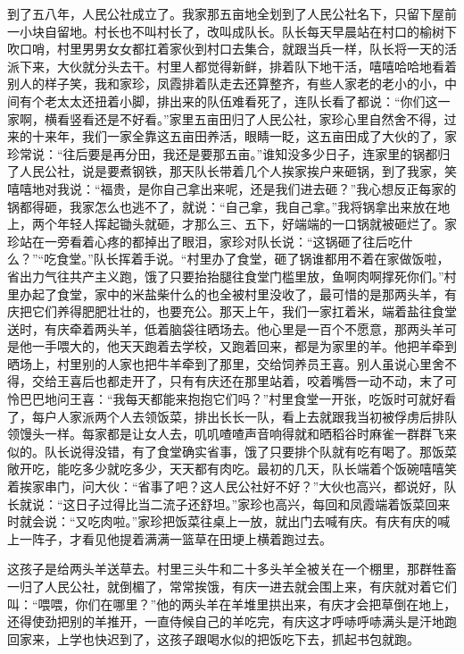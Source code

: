 \documentclass[12pt,UTF8]{ctexbook}
\begin{document}
到了五八年，人民公社成立了。我家那五亩地全划到了人民公社名下，只留下屋前一小块自留地。村长也不叫村长了，改叫成队长。队长每天早晨站在村口的榆树下吹口哨，村里男男女女都扛着家伙到村口去集合，就跟当兵一样，队长将一天的活派下来，大伙就分头去干。村里人都觉得新鲜，排着队下地干活，嘻嘻哈哈地看着别人的样子笑，我和家珍，凤霞排着队走去还算整齐，有些人家老的老小的小，中间有个老太太还扭着小脚，排出来的队伍难看死了，连队长看了都说：“你们这一家啊，横看竖看还是不好看。”家里五亩田归了人民公社，家珍心里自然舍不得，过来的十来年，我们一家全靠这五亩田养活，眼睛一眨，这五亩田成了大伙的了，家珍常说：“往后要是再分田，我还是要那五亩。”谁知没多少日子，连家里的锅都归了人民公社，说是要煮钢铁，那天队长带着几个人挨家挨户来砸锅，到了我家，笑嘻嘻地对我说：“福贵，是你自己拿出来呢，还是我们进去砸？”我心想反正每家的锅都得砸，我家怎么也逃不了，就说：“自己拿，我自己拿。”我将锅拿出来放在地上，两个年轻人挥起锄头就砸，才那么三、五下，好端端的一口锅就被砸烂了。家珍站在一旁看着心疼的都掉出了眼泪，家珍对队长说：“这锅砸了往后吃什么？”“吃食堂。”队长挥着手说。“村里办了食堂，砸了锅谁都用不着在家做饭啦，省出力气往共产主义跑，饿了只要抬抬腿往食堂门槛里放，鱼啊肉啊撑死你们。”村里办起了食堂，家中的米盐柴什么的也全被村里没收了，最可惜的是那两头羊，有庆把它们养得肥肥壮壮的，也要充公。那天上午，我们一家扛着米，端着盐往食堂送时，有庆牵着两头羊，低着脑袋往晒场去。他心里是一百个不愿意，那两头羊可是他一手喂大的，他天天跑着去学校，又跑着回来，都是为家里的羊。他把羊牵到晒场上，村里别的人家也把牛羊牵到了那里，交给饲养员王喜。别人虽说心里舍不得，交给王喜后也都走开了，只有有庆还在那里站着，咬着嘴唇一动不动，末了可怜巴巴地问王喜：“我每天都能来抱抱它们吗？”村里食堂一开张，吃饭时可就好看了，每户人家派两个人去领饭菜，排出长长一队，看上去就跟我当初被俘虏后排队领馒头一样。每家都是让女人去，叽叽喳喳声音响得就和晒稻谷时麻雀一群群飞来似的。队长说得没错，有了食堂确实省事，饿了只要排个队就有吃有喝了。那饭菜敞开吃，能吃多少就吃多少，天天都有肉吃。最初的几天，队长端着个饭碗嘻嘻笑着挨家串门，问大伙：“省事了吧？这人民公社好不好？”大伙也高兴，都说好，队长就说：“这日子过得比当二流子还舒坦。”家珍也高兴，每回和凤霞端着饭菜回来时就会说：“又吃肉啦。”家珍把饭菜往桌上一放，就出门去喊有庆。有庆有庆的喊上一阵子，才看见他提着满满一篮草在田埂上横着跑过去。

这孩子是给两头羊送草去。村里三头牛和二十多头羊全被关在一个棚里，那群牲畜一归了人民公社，就倒楣了，常常挨饿，有庆一进去就会围上来，有庆就对着它们叫：“喂喂，你们在哪里？”他的两头羊在羊堆里拱出来，有庆才会把草倒在地上，还得使劲把别的羊推开，一直侍候自己的羊吃完，有庆这才呼哧呼哧满头是汗地跑回家来，上学也快迟到了，这孩子跟喝水似的把饭吃下去，抓起书包就跑。
\end{document}
